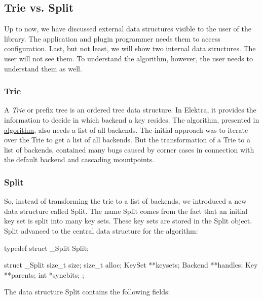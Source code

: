 \subsection*{Trie vs. Split}

Up to now, we have discussed external data structures visible to the user of the library. The application and plugin programmer needs them to access configuration. Last, but not least, we will show two internal data structures. The user will not see them. To understand the algorithm, however, the user needs to understand them as well.

\subsubsection*{Trie}

A {\itshape Trie} or prefix tree is an ordered tree data structure. In Elektra, it provides the information to decide in which backend a key resides. The algorithm, presented in \hyperlink{doc_dev_algorithm_md}{algorithm}, also needs a list of all backends. The initial approach was to iterate over the {\ttfamily Trie} to get a list of all backends. But the transformation of a {\ttfamily Trie} to a list of backends, contained many bugs caused by corner cases in connection with the default backend and cascading mountpoints.

\subsubsection*{Split}

So, instead of transforming the trie to a list of backends, we introduced a new data structure called {\ttfamily Split}. The name {\ttfamily Split} comes from the fact that an initial key set is split into many key sets. These key sets are stored in the {\ttfamily Split} object. {\ttfamily Split} advanced to the central data structure for the algorithm\+: \begin{DoxyVerb}    typedef struct _Split   Split;

    struct _Split {
            size_t size;
            size_t alloc;
            KeySet **keysets;
            Backend **handles;
            Key **parents;
            int *syncbits;
    };
\end{DoxyVerb}


The data structure {\ttfamily Split} contains the following fields\+:


